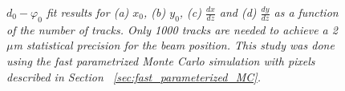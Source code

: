\documentclass{cmspaper}
\begin{document}
\begin{figure}[htp]
  \centering
    \caption{\it    $d_0-\varphi_0$ fit results for (a) $x_0$, (b) $y_0$, (c) $\frac{dx}{dz}$ and (d) $\frac{dy}{dz}$  as a function of the number of tracks.
 Only 1000 tracks are needed to achieve a 2 $\mu$m statistical precision for the beam position. This study was done using the fast parametrized Monte 
Carlo simulation with pixels described in Section ~\ref{sec:fast_parameterized_MC}.  }
    \label{fig:x0_and_y0_dphi_fit}

\end{figure}
\end{document}
